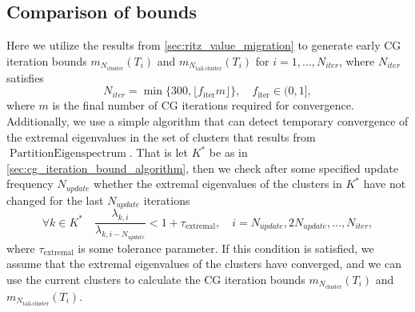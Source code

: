 \subsection{Comparison of bounds}\label{sec:comparison_of_bounds}
Here we utilize the results from \cref{sec:ritz_value_migration} to generate early CG iteration bounds $m_{N_{\text{cluster}}}(T_i)$ and $m_{N_{\text{tail-cluster}}}(T_i)$ for $i=1,\ldots,N_{iter}$, where $N_{iter}$ satisfies
\[
    N_{iter} = \min\{300, \lfloor f_{\text{iter}} m \rfloor\}, \quad f_{\text{iter}} \in (0,1],
\]
where $m$ is the final number of CG iterations required for convergence. Additionally, we use a simple algorithm that can detect temporary convergence of the extremal eigenvalues in the set of clusters that results from $\operatorname{PartitionEigenspectrum}$. That is let $K^*$ be as in \cref{sec:cg_iteration_bound_algorithm}, then we check after some specified update frequency $N_{update}$ whether the extremal eigenvalues of the clusters in $K^*$ have not changed for the last $N_{update}$ iterations
\begin{equation}
    \forall k \in K^* \quad \frac{\lambda_{k, i}}{\lambda_{k, i-N_{update}}} < 1+\tau_{\text{extremal}}, \quad i = N_{update}, 2N_{update}, \ldots, N_{iter},
    \label{eq:extremal_eigenvalue_convergence_condition}
\end{equation}
where $\tau_{\text{extremal}}$ is some tolerance parameter. If this condition is satisfied, we assume that the extremal eigenvalues of the clusters have converged, and we can use the current clusters to calculate the CG iteration bounds $m_{N_{\text{cluster}}}(T_i)$ and $m_{N_{\text{tail-cluster}}}(T_i)$.

